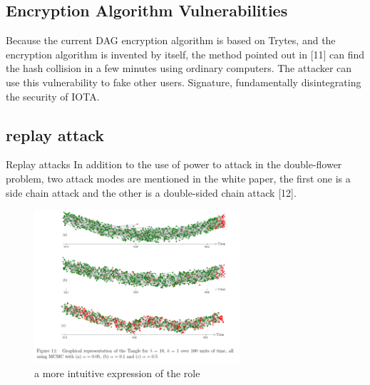\subsection{Encryption Algorithm Vulnerabilities}
Because the current DAG encryption algorithm is based on Trytes, and the encryption algorithm is invented by itself, the method pointed out in [11] can find the hash collision in a few minutes using ordinary computers. The attacker can use this vulnerability to fake other users. Signature, fundamentally disintegrating the security of IOTA.

\subsection{ replay attack}
Replay attacks In addition to the use of power to attack in the double-flower problem, two attack modes are mentioned in the white paper, the first one is a side chain attack and the other is a double-sided chain attack [12]. 

\begin{figure}[H]
	\centering
	\includegraphics[width=3.0in]{figures/screenshot017.png}
	\caption{a more intuitive expression of the role}
	\label{simulationfigure}
\end{figure}
